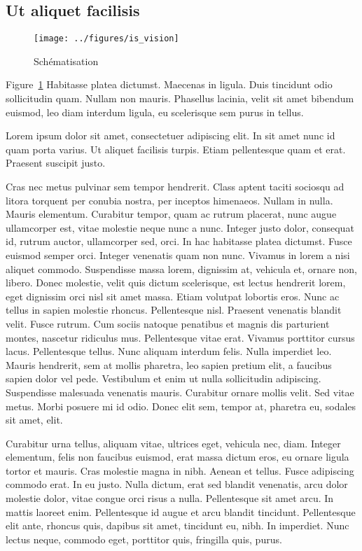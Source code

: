 \documentclass[../hdr.tex]{subfiles}
\begin{document}
\subsection{Ut aliquet facilisis}

\begin{figure}[ht]
	\centering
	\texttt{[image: ../figures/is\_vision]}
	\caption{Schématisation}
	\label{is_vision2}
\end{figure}

\bigskip 

Figure~\ref{is_vision2} Habitasse platea dictumst. Maecenas in ligula. Duis
tincidunt odio sollicitudin quam. Nullam non mauris. Phasellus lacinia, velit
sit amet bibendum euismod, leo diam interdum ligula, eu scelerisque sem purus in
tellus.

Lorem ipsum dolor sit amet, consectetuer adipiscing elit. In sit amet nunc id
quam porta varius. Ut aliquet facilisis turpis. Etiam pellentesque quam et erat.
Praesent suscipit justo.

Cras nec metus pulvinar sem tempor hendrerit. Class aptent taciti sociosqu ad
litora torquent per conubia nostra, per inceptos himenaeos. Nullam in nulla.
Mauris elementum. Curabitur tempor, quam ac rutrum placerat, nunc augue
ullamcorper est, vitae molestie neque nunc a nunc. Integer justo dolor,
consequat id, rutrum auctor, ullamcorper sed, orci. In hac habitasse platea
dictumst. Fusce euismod semper orci. Integer venenatis quam non nunc. Vivamus in
lorem a nisi aliquet commodo. Suspendisse massa lorem, dignissim at, vehicula
et, ornare non, libero. Donec molestie, velit quis dictum scelerisque, est
lectus hendrerit lorem, eget dignissim orci nisl sit amet massa. Etiam volutpat
lobortis eros. Nunc ac tellus in sapien molestie rhoncus. Pellentesque nisl.
Praesent venenatis blandit velit. Fusce rutrum. Cum sociis natoque penatibus et
magnis dis parturient montes, nascetur ridiculus mus. Pellentesque vitae erat.
Vivamus porttitor cursus lacus. Pellentesque tellus. Nunc aliquam interdum
felis. Nulla imperdiet leo. Mauris hendrerit, sem at mollis pharetra, leo sapien
pretium elit, a faucibus sapien dolor vel pede. Vestibulum et enim ut nulla
sollicitudin adipiscing. Suspendisse malesuada venenatis mauris. Curabitur
ornare mollis velit. Sed vitae metus. Morbi posuere mi id odio. Donec elit sem,
tempor at, pharetra eu, sodales sit amet, elit.

Curabitur urna tellus, aliquam vitae, ultrices eget, vehicula nec, diam. Integer
elementum, felis non faucibus euismod, erat massa dictum eros, eu ornare ligula
tortor et mauris. Cras molestie magna in nibh. Aenean et tellus. Fusce
adipiscing commodo erat. In eu justo. Nulla dictum, erat sed blandit venenatis,
arcu dolor molestie dolor, vitae congue orci risus a nulla. Pellentesque sit
amet arcu. In mattis laoreet enim. Pellentesque id augue et arcu blandit
tincidunt. Pellentesque elit ante, rhoncus quis, dapibus sit amet, tincidunt eu,
nibh. In imperdiet. Nunc lectus neque, commodo eget, porttitor quis, fringilla
quis, purus.
\end{document}
